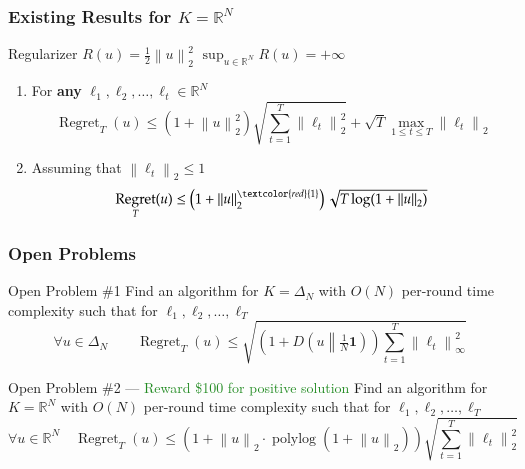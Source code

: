 \documentclass[usenames,dvipsnames]{beamer}
\DeclareMathOperator{\Regret}{Regret}
\DeclareMathOperator{\polylog}{polylog}
\newcommand{\R}{\mathbb{R}}
\newcommand{\indicator}{\mathbf{1}}
\newcommand{\norm}[1]{\left\|#1\right\|}
\newcommand{\KL}[2]{D\left({#1}\middle\|{#2}\right)}
\newcommand{\Cite}[1]{{\tiny \textcolor{Blue}{[#1]}}}
\begin{document}
\begin{frame}
\frametitle{Existing Results for $K=\R^N$}

Regularizer $R(u) = \frac{1}{2}\norm{u}_2^2$ \qquad $\sup_{u \in \R^N} R(u) = +\infty$

\vspace{1cm}

\begin{enumerate}

\item For \textbf{any} $\ell_1, \ell_2, \dots, \ell_t \in \R^N$ \qquad \Cite{OP'15}
$$
\Regret_T(u) \le \left( 1+\norm{u}_2^2 \right) \sqrt{\sum_{t=1}^T \norm{\ell_t}_2^2} + \sqrt{T} \max_{1 \le t \le T} \norm{\ell_t}_2
$$

\item Assuming that $\norm{\ell_t}_2 \le 1$ \qquad \Cite{SM'12, O'13, MA'13, MO'14, O'14, OP'16}
$$
\Regret_T(u) \le \left( 1 + \norm{u}_2^{\textcolor{red}{1}} \right) \sqrt{T \log(1+\norm{u}_2)}
$$
\end{enumerate}
\end{frame}

\begin{frame}
\frametitle{Open Problems}

\begin{block}{Open Problem \#1}
Find an algorithm for $K=\Delta_N$ with $O(N)$ per-round time complexity
such that for  $\ell_1, \ell_2, \dots, \ell_T$
$$
\forall u \in \Delta_N \qquad
\Regret_T(u) \le \sqrt{\left(1 + \KL{u}{\tfrac{1}{N}\indicator}\right) \sum_{t=1}^T \norm{\ell_t}_\infty^2}
$$
\end{block}

\begin{block}{Open Problem \#2 --- \textcolor{ForestGreen}{Reward \$100 for positive solution}}
Find an algorithm for $K=\R^N$ with $O(N)$ per-round time complexity
such that for  $\ell_1, \ell_2, \dots, \ell_T$
$$
\forall u \in \R^N \quad
\Regret_T(u) \le (1 + \norm{u}_2 \cdot \polylog(1+\norm{u}_2)) \sqrt{\sum_{t=1}^T \norm{\ell_t}_2^2}
$$
\end{block}
\end{frame}
\end{document}
